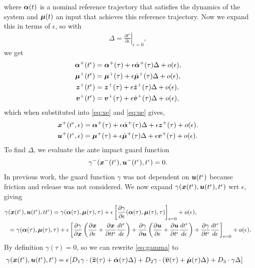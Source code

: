 \documentclass[../DC2019003Bouma.tex]{subfiles}
\begin{document}
where $\boldsymbol{\alpha}(t)$ is a nominal reference trajectory that satisfies the dynamics of the system and $\boldsymbol{\mu}(t)$ an input that achieves this reference trajectory. Now we expand this in terms of $\epsilon$, so with
\begin{align}
\Delta = \left.\frac{\partial t^\epsilon}{\partial\epsilon}\right|_{\epsilon=0},
\end{align} 
we get
\begin{align}
\boldsymbol{\alpha}^{+}(t^\epsilon) &= \boldsymbol{\alpha}^{+}(\tau) + \epsilon \dot{\boldsymbol{\alpha}}^{+}(\tau)\Delta + o(\epsilon),\\
\boldsymbol{\mu}^{+}(t^\epsilon) &= \boldsymbol{\mu}^{+}(\tau) + \epsilon \dot{\boldsymbol{\mu}}^{+}(\tau)\Delta + o(\epsilon),\\
{\boldsymbol{z}}^{+}(t^\epsilon) &= {\boldsymbol{z}}^{+}(\tau) + \epsilon \dot{{\boldsymbol{z}}}^{+}(\tau)\Delta + o(\epsilon),\\
{\boldsymbol{v}}^{+}(t^\epsilon) &= {\boldsymbol{v}}^{+}(\tau) + \epsilon \dot{{\boldsymbol{v}}}^{+}(\tau)\Delta + o(\epsilon),
\end{align}
which when substituted into \eqref{eq:xe} and \eqref{eq:ue} gives,
\begin{align}
{\boldsymbol{x}}^{+}(t^\epsilon,\epsilon) &= \boldsymbol{\alpha}^{+}(\tau) + \epsilon \dot{\boldsymbol{\alpha}}^{+}(\tau)\Delta + \epsilon {\boldsymbol{z}}^{+}(\tau) + o(\epsilon). \label{eq:xeexp}\\
{\boldsymbol{u}}^{+}(t^\epsilon,\epsilon) &= \boldsymbol{\mu}^{+}(\tau) + \epsilon \dot{\boldsymbol{\mu}}^{+}(\tau)\Delta + \epsilon {\boldsymbol{v}}^{+}(\tau) + o(\epsilon). \label{eq:ueexp}
\end{align}
 To find $\Delta$, we evaluate the ante impact guard function
\begin{align}
\gamma^{-}( {\boldsymbol{x}}^{-}(t^\epsilon),{\boldsymbol{u}}^{-}(t^\epsilon),t^\epsilon) = 0.
\end{align}
In previous work, the guard function $\gamma$ was not dependent on ${\boldsymbol{u}}(t^\epsilon)$ because friction and release was not considered. We now expand $\gamma({\boldsymbol{x}}(t^\epsilon),{\boldsymbol{u}}(t^\epsilon),t^\epsilon)$ wrt $\epsilon$, giving
\begin{align}
\gamma&({\boldsymbol{x}}(t^\epsilon),{\boldsymbol{u}}(t^\epsilon),tt^\epsilon) = \gamma( \boldsymbol{\alpha}(\tau), \boldsymbol{\mu}(\tau),\tau) + \epsilon\left[\frac{\partial \gamma}{\partial\epsilon}(\boldsymbol{\alpha}(\tau),\boldsymbol{\mu}(\tau),\tau)\right]_{\epsilon=0} + o(\epsilon),\\
&= \gamma( \boldsymbol{\alpha}(\tau), \boldsymbol{\mu}(\tau),\tau) + \epsilon\left[ \frac{\partial\gamma}{\partial{\boldsymbol{x}}}\left(\frac{\partial{\boldsymbol{x}}}{\partial\epsilon} + \frac{\partial{\boldsymbol{x}}}{\partial tt^\epsilon}\frac{d t^\epsilon}{d\epsilon}\right) + \frac{\partial\gamma}{\partial{\boldsymbol{u}}}\left(\frac{\partial{\boldsymbol{u}}}{\partial\epsilon} + \frac{\partial{\boldsymbol{u}}}{\partial t^\epsilon}\frac{d t^\epsilon}{d\epsilon}\right) + \frac{\partial\gamma}{\partial t^\epsilon}\frac{d t^\epsilon}{d\epsilon}  \right]_{\epsilon=0} + o(\epsilon). \label{eq:gamma}
\end{align}
By definition $\gamma(\tau) = 0$, so we can rewrite \eqref{eq:gamma} to
\begin{align}
\gamma&({\boldsymbol{x}}(t^\epsilon),{\boldsymbol{u}}(t^\epsilon),t^\epsilon) = \epsilon\left[ D_1 \gamma\cdot \left( \overline{{\boldsymbol{z}}}(\tau) + \dot{\boldsymbol{\alpha}}(\tau)\Delta\right) + D_2 \gamma\cdot  \left( \overline{{\boldsymbol{v}}}(\tau) + \dot{\boldsymbol{\mu}}(\tau) \Delta\right) + D_3\cdot  \gamma \Delta \right]\label{eq:gamma2}
\end{align}
\end{document}
